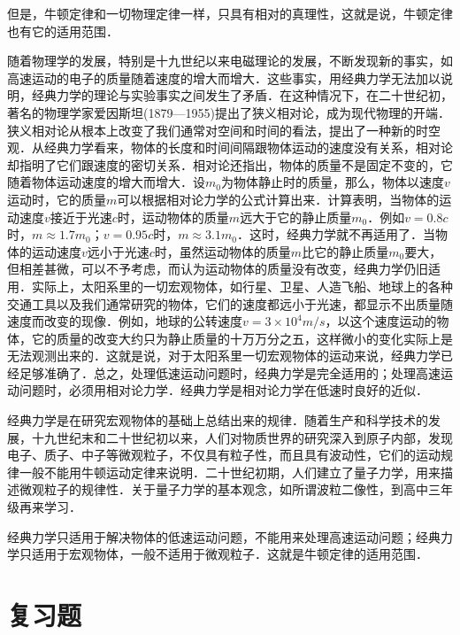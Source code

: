 但是，牛顿定律和一切物理定律一样，只具有相对的真理性，这就是说，牛顿定律也有它的适用范围．

随着物理学的发展，特别是十九世纪以来电磁理论的发展，不断发现新的事实，如高速运动的电子的质量随着速度的增大而增大．这些事实，用经典力学无法加以说明，经典力学的理论与实验事实之间发生了矛盾．在这种情况下，在二十世纪初，著名的物理学家爱因斯坦(1879—1955)提出了狭义相对论，成为现代物理的开端．狭义相对论从根本上改变了我们通常对空间和时间的看法，提出了一种新的时空观．从经典力学看来，物体的长度和时间间隔跟物体运动的速度没有关系，相对论却指明了它们跟速度的密切关系．相对论还指出，物体的质量不是固定不变的，它随着物体运动速度的增大而增大．设$m_0$为物体静止时的质量，那么，物体以速度$v$运动时，它的质量$m$可以根据相对论力学的公式计算出来．计算表明，当物体的运动速度$v$接近于光速$c$时，运动物体的质量$m$远大于它的静止质量$m_0$．例如$v=0.8c$时，$m\approx 1.7m_0$；$v=0.95c$时，$m\approx 3.1m_0$．这时，经典力学就不再适用了．当物体的运动速度$v$远小于光速$c$时，虽然运动物体的质量$m$比它的静止质量$m_0$要大，但相差甚微，可以不予考虑，而认为运动物体的质量没有改变，经典力学仍旧适用．实际上，太阳系里的一切宏观物体，如行星、卫星、人造飞船、地球上的各种交通工具以及我们通常研究的物体，它们的速度都远小于光速，都显示不出质量随速度而改变的现像．例如，地球的公转速度$v=3\times 10^4\si{m/s}$，以这个速度运动的物体，它的质量的改变大约只为静止质量的十万万分之五，这样微小的变化实际上是无法观测出来的．这就是说，对于太阳系里一切宏观物体的运动来说，经典力学已经足够准确了．总之，处理低速运动问题时，经典力学是完全适用的；处理高速运动问题时，必须用相对论力学．经典力学是相对论力学在低速时良好的近似．

经典力学是在研究宏观物体的基础上总结出来的规律．随着生产和科学技术的发展，十九世纪末和二十世纪初以来，人们对物质世界的研究深入到原子内部，发现电子、质子、中子等微观粒子，不仅具有粒子性，而且具有波动性，它们的运动规律一般不能用牛顿运动定律来说明．二十世纪初期，人们建立了量子力学，用来描述微观粒子的规律性．关于量子力学的基本观念，如所谓波粒二像性，到高中三年级再来学习．

经典力学只适用于解决物体的低速运动问题，不能用来处理高速运动问题；经典力学只适用于宏观物体，一般不适用于微观粒子．这就是牛顿定律的适用范围．
\newpage
\section*{复习题}

